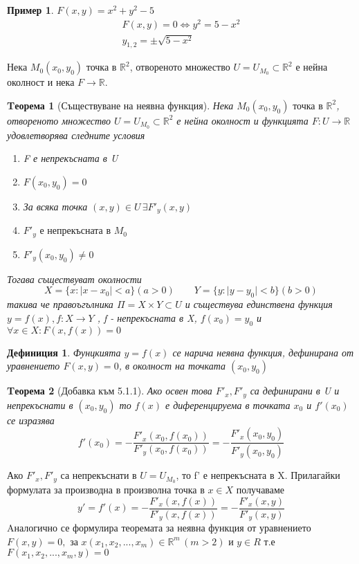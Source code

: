 \documentclass[a4paper,fleqn,12pt]{article}
\newtheorem{theorem}{Tеорема}[subsection]
\newtheorem{definition}{Дефиниция}[subsection]
\newtheorem{example}{Пример}[subsection]
\begin{document}
\begin{example}
$F(x,y) = x^2 +y^2 - 5$
\begin{gather*}
F(x,y) = 0 \Leftrightarrow y^2 = 5-x^2 \\
y_{1,2} = \pm \sqrt{5-x^2}
\end{gather*}
\end{example}
Нека $M_0 (x_0, y_0) \text{ точка в } \mathbb{R}^2$, отвореното множество $U = U_{M_0} \subset \mathbb{R}^2$ е нейна околност и нека $F \to \mathbb{R}$. 

\begin{theorem}[Съществуване на неявна функция]
Нека $M_0 (x_0, y_0) \text{ точка в } \mathbb{R}^2$, отвореното множество $U = U_{M_0} \subset \mathbb{R}^2$ е нейна околност и функцията $F: U \to \mathbb{R}$ удовлетворява следните условия
\begin{enumerate}

\item F е непрекъсната в U

\item $F(x_0, y_0) = 0$

\item За всяка точка $(x, y) \in U \, \exists F'_y(x,y)$

\item $F'_y \text{ е непрекъсната в } M_0$

\item $F'_y (x_0, y_0) \neq 0$
\end{enumerate}
Тогава съществуват околности
$$X = \{x: \vert x - x_0 \vert < a\} (a>0) \qquad Y = \{y: \vert y - y_0 \vert < b\} (b>0)$$
такива че правоъгълника $\Pi = X \times Y \subset U$ и съществува единствена функция $y = f(x), f: X \to Y$ , f - непрекъсната в X, $f(x_0) = y_0$ и $\forall x \in X: F(x,f(x)) = 0 $ 
\end{theorem}

\begin{definition}
Фунцкията $y = f(x)$ се нарича неявна функция, дефинирана от уравнението $F(x,y) = 0$, в околност на точката $(x_0, y_0)$
\end{definition}


\begin{theorem}[Добавка към 5.1.1]
Ако освен това $F'_x, F'_y$ са дефинирани в U и непрекъснати в $(x_0, y_0)$ то $f(x)$ е диференцируема в точката $x_0$ и $f'(x_0)$ се изразява
$$f'(x_0) = - \dfrac{F'_x(x_0,f(x_0))}{F'_y(x_0,f(x_0))} = - \dfrac{F'_x(x_0,y_0)}{F'_y(x_0,y_0)} $$
\end{theorem}
Ако $F'_x, F'_y$ са непрекъснати в $U = U_{M_0}$, то f' е непрекъсната в X. Прилагайки формулата за производна в произволна точка в $x \in X$ получаваме
\begin{equation}
y' = f'(x) = - \dfrac{F'_x(x,f(x))}{F'_y(x,f(x))} = - \dfrac{F'_x(x,y)}{F'_y(x,y)}
\end{equation}
Aналогично се формулира теоремата за неявна функция от уравнението $F(x,y) = 0, \text{ за } x(x_1, x_2, ..., x_m) \in \mathbb{R}^m \, (m >2)$ и $y \in R$ т.е $F(x_1, x_2, ..., x_m, y) = 0$\\
\end{document}
